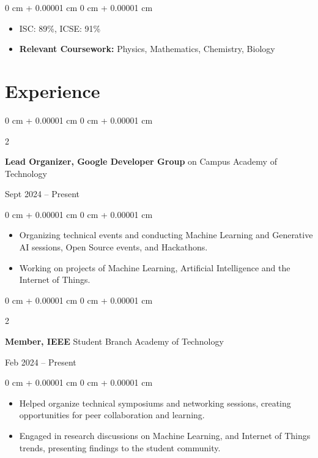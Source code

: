 \documentclass[9pt, letterpaper]{extarticle}
\newenvironment{highlights}{
    \begin{itemize}[
        topsep=0.10 cm,
        parsep=0.10 cm,
        partopsep=0pt,
        itemsep=0pt,
        leftmargin=0 cm + 10pt
    ]
}{
    \end{itemize}
} %
\newenvironment{onecolentry}{
    \begin{adjustwidth}{
        0 cm + 0.00001 cm
    }{
        0 cm + 0.00001 cm
    }
}{
    \end{adjustwidth}
} %
\newenvironment{twocolentry}[2][]{
    \onecolentry
    \def\secondColumn{#2}
    \setcolumnwidth{\fill, 4.5 cm}
    \begin{paracol}{2}
}{
    \switchcolumn \raggedleft \secondColumn
    \end{paracol}
    \endonecolentry
} %
\begin{document}
\vspace{0.10 cm}

\begin{onecolentry}
    \begin{highlights}
        \item ISC: 89\%, ICSE: 91\%
        \item \textbf{Relevant Coursework:} Physics, Mathematics, Chemistry, Biology
    \end{highlights}
\end{onecolentry}



\section{Experience}

\begin{twocolentry}{
    Sept 2024 – Present
}
    \textbf{Lead Organizer, Google Developer Group} on Campus Academy of Technology
\end{twocolentry}

\vspace{0.10 cm}

\begin{onecolentry}
    \begin{highlights}
        \item Organizing technical events and conducting Machine Learning and Generative AI sessions, Open Source events, and Hackathons. 
        \item Working on projects of Machine Learning, Artificial Intelligence and the Internet of Things.
    \end{highlights}
\end{onecolentry}

\vspace{0.2 cm}

\begin{twocolentry}{
    Feb 2024 – Present
}
    \textbf{Member, IEEE} Student Branch Academy of Technology
\end{twocolentry}

\vspace{0.10 cm}

\begin{onecolentry}
    \begin{highlights}
        \item Helped organize technical symposiums and networking sessions, creating opportunities for peer collaboration and learning.
        \item Engaged in research discussions on Machine Learning, and Internet of Things trends, presenting findings to the student community.
    \end{highlights}
\end{onecolentry}
\end{document}
